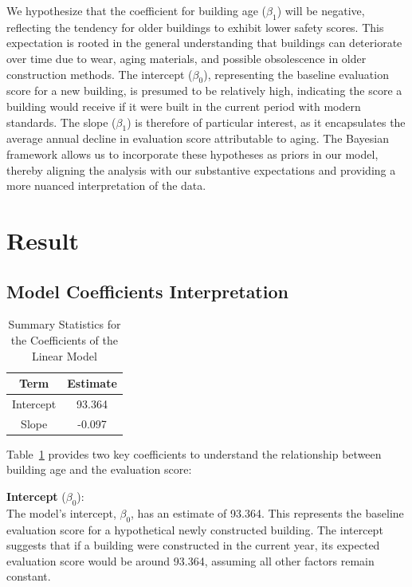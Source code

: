 \documentclass[
  letterpaper,
  DIV=11,
  numbers=noendperiod]{scrartcl}
\begin{document}
We hypothesize that the coefficient for building age (\(\beta_1\)) will
be negative, reflecting the tendency for older buildings to exhibit
lower safety scores. This expectation is rooted in the general
understanding that buildings can deteriorate over time due to wear,
aging materials, and possible obsolescence in older construction
methods. The intercept (\(\beta_0\)), representing the baseline
evaluation score for a new building, is presumed to be relatively high,
indicating the score a building would receive if it were built in the
current period with modern standards. The slope (\(\beta_1\)) is
therefore of particular interest, as it encapsulates the average annual
decline in evaluation score attributable to aging. The Bayesian
framework allows us to incorporate these hypotheses as priors in our
model, thereby aligning the analysis with our substantive expectations
and providing a more nuanced interpretation of the data.

\hypertarget{sec-result}{%
\section{Result}\label{sec-result}}

\hypertarget{model-coefficients-interpretation}{%
\subsection{Model Coefficients
Interpretation}\label{model-coefficients-interpretation}}

\hypertarget{tbl-coefficient-table}{}
\begin{longtable}[t]{cc}
\caption{\label{tbl-coefficient-table}Summary Statistics for the Coefficients of the Linear Model }\tabularnewline

\toprule
Term & Estimate\\
\midrule
Intercept & 93.364\\
Slope & -0.097\\
\bottomrule
\end{longtable}

Table~\ref{tbl-coefficient-table} provides two key coefficients to
understand the relationship between building age and the evaluation
score:

\textbf{Intercept} (\(\beta_0\)):\\
The model's intercept, \(\beta_0\), has an estimate of 93.364. This
represents the baseline evaluation score for a hypothetical newly
constructed building. The intercept suggests that if a building were
constructed in the current year, its expected evaluation score would be
around 93.364, assuming all other factors remain constant.
\end{document}
